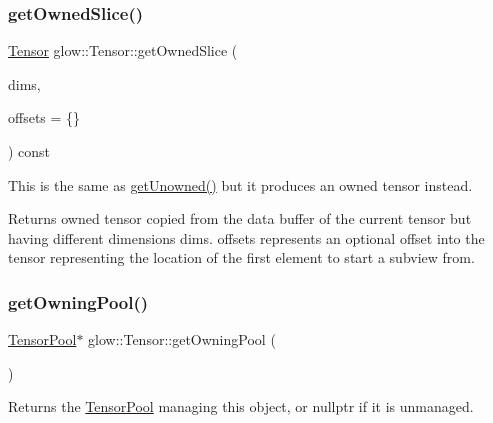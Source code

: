 \subsubsection{\texorpdfstring{get\+Owned\+Slice()}{getOwnedSlice()}}
{\footnotesize\ttfamily \hyperlink{classglow_1_1_tensor}{Tensor} glow\+::\+Tensor\+::get\+Owned\+Slice (\begin{DoxyParamCaption}\item[{llvm\+::\+Array\+Ref$<$ size\+\_\+t $>$}]{dims,  }\item[{llvm\+::\+Array\+Ref$<$ size\+\_\+t $>$}]{offsets = {\ttfamily \{\}} }\end{DoxyParamCaption}) const\hspace{0.3cm}{\ttfamily [inline]}}

This is the same as \hyperlink{classglow_1_1_tensor_a2b71346a672215c780ec46d1925c6d03}{get\+Unowned()} but it produces an owned tensor instead. \begin{DoxyReturn}{Returns}
owned tensor copied from the data buffer of the current tensor but having different dimensions {\ttfamily dims}. {\ttfamily offsets} represents an optional offset into the tensor representing the location of the first element to start a subview from. 
\end{DoxyReturn}
\mbox{\label{classglow_1_1_tensor_a62651514d8a45c6633948a87a1766e56}} 
\subsubsection{\texorpdfstring{get\+Owning\+Pool()}{getOwningPool()}}
{\footnotesize\ttfamily \hyperlink{classglow_1_1_tensor_pool}{Tensor\+Pool}$\ast$ glow\+::\+Tensor\+::get\+Owning\+Pool (\begin{DoxyParamCaption}{ }\end{DoxyParamCaption})\hspace{0.3cm}{\ttfamily [inline]}}

\begin{DoxyReturn}{Returns}
the \hyperlink{classglow_1_1_tensor_pool}{Tensor\+Pool} managing this object, or nullptr if it is unmanaged. 
\end{DoxyReturn}
\mbox{\label{classglow_1_1_tensor_a5ef091fe78b378595f2ce3adf32b1821}} 
